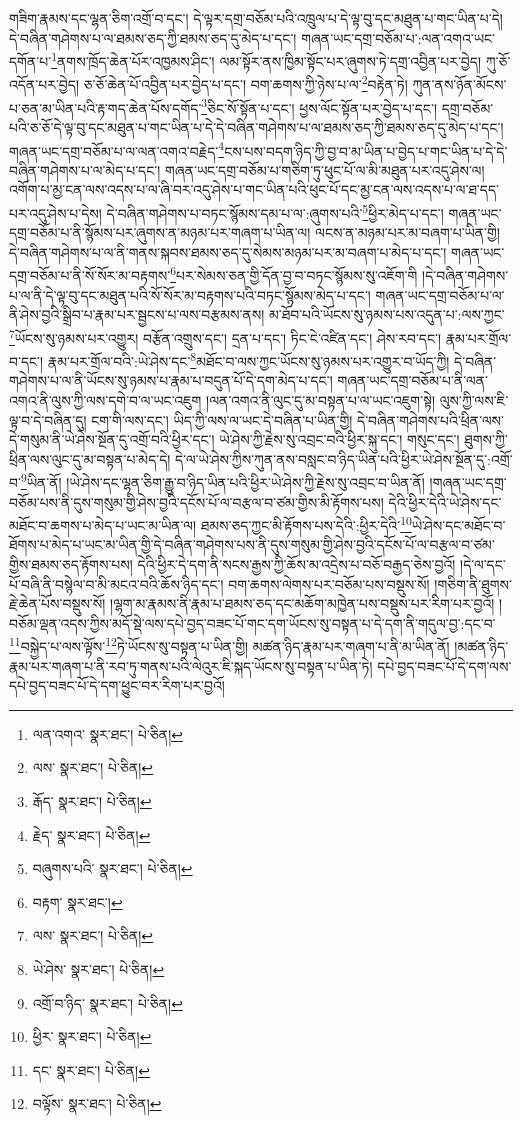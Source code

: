གཟིག་རྣམས་དང་ལྷན་ཅིག་འགྲོ་བ་དང་། དེ་ལྟར་དགྲ་བཅོམ་པའི་འཁྲུལ་པ་དེ་ལྟ་བུ་དང་མཐུན་པ་གང་ཡིན་པ་དེ། དེ་བཞིན་གཤེགས་པ་ལ་ཐམས་ཅད་ཀྱི་ཐམས་ཅད་དུ་མེད་པ་དང་། གཞན་ཡང་དགྲ་བཅོམ་པ་:ལན་འགའ་ཡང་དགོན་པ་\footnote{ལན་འགའ་  སྣར་ཐང་།  པེ་ཅིན། }ནགས་ཁྲོད་ཆེན་པོར་འཁྱམས་ཤིང་། ལམ་སྟོར་ནས་ཁྱིམ་སྟོང་པར་ཞུགས་ཏེ་དགྲ་འབྱིན་པར་བྱེད། ཀུ་ཅོ་འདོན་པར་བྱེད། ཅ་ཅོ་ཆེན་པོ་འབྱིན་པར་བྱེད་པ་དང་། བག་ཆགས་ཀྱི་ཉེས་པ་ལ་\footnote{ལས་  སྣར་ཐང་།  པེ་ཅིན། }བརྟེན་ཏེ། ཀུན་ནས་ཉོན་མོངས་པ་ཅན་མ་ཡིན་པའི་རྟ་གད་ཆེན་པོས་དགོད་\footnote{རྒོད་  སྣར་ཐང་།  པེ་ཅིན། }ཅིང་སོ་སྟོན་པ་དང་། ཕྱས་ལོང་སྟོན་པར་བྱེད་པ་དང་། དགྲ་བཅོམ་པའི་ཅ་ཅོ་དེ་ལྟ་བུ་དང་མཐུན་པ་གང་ཡིན་པ་དེ་དེ་བཞིན་གཤེགས་པ་ལ་ཐམས་ཅད་ཀྱི་ཐམས་ཅད་དུ་མེད་པ་དང་། གཞན་ཡང་དགྲ་བཅོམ་པ་ལ་ལན་འགའ་བརྗེད་\footnote{རྗེད་  སྣར་ཐང་།  པེ་ཅིན། }ངས་པས་བདག་ཉིད་ཀྱི་བྱ་བ་མ་ཡིན་པ་བྱེད་པ་གང་ཡིན་པ་དེ་དེ་བཞིན་གཤེགས་པ་ལ་མེད་པ་དང་། གཞན་ཡང་དགྲ་བཅོམ་པ་གཅིག་ཏུ་ཕུང་པོ་ལ་མི་མཐུན་པར་འདུ་ཤེས་ལ། འགོག་པ་མྱ་ངན་ལས་འདས་པ་ལ་ཞི་བར་འདུ་ཤེས་པ་གང་ཡིན་པའི་ཕུང་པོ་དང་མྱ་ངན་ལས་འདས་པ་ལ་ཐ་དད་པར་འདུ་ཤེས་པ་དེས། དེ་བཞིན་གཤེགས་པ་བཏང་སྙོམས་དམ་པ་ལ་:ཞུགས་པའི་\footnote{བཞུགས་པའི་  སྣར་ཐང་།  པེ་ཅིན། }ཕྱིར་མེད་པ་དང་། གཞན་ཡང་དགྲ་བཅོམ་པ་ནི་སྙོམས་པར་ཞུགས་ན་མཉམ་པར་གཞག་པ་ཡིན་ལ། ལངས་ན་མཉམ་པར་མ་བཞག་པ་ཡིན་གྱི། དེ་བཞིན་གཤེགས་པ་ལ་ནི་གནས་སྐབས་ཐམས་ཅད་དུ་སེམས་མཉམ་པར་མ་བཞག་པ་མེད་པ་དང་། གཞན་ཡང་དགྲ་བཅོམ་པ་ནི་སོ་སོར་མ་བརྟགས་\footnote{བརྟག་  སྣར་ཐང་། }པར་སེམས་ཅན་གྱི་དོན་བྱ་བ་བཏང་སྙོམས་སུ་འཇོག་གི །དེ་བཞིན་གཤེགས་པ་ལ་ནི་དེ་ལྟ་བུ་དང་མཐུན་པའི་སོ་སོར་མ་བརྟགས་པའི་བཏང་སྙོམས་མེད་པ་དང་། གཞན་ཡང་དགྲ་བཅོམ་པ་ལ་ནི་ཤེས་བྱའི་སྒྲིབ་པ་རྣམ་པར་སྦྱངས་པ་ལས་བརྩམས་ནས། མ་ཐོབ་པའི་ཡོངས་སུ་ཉམས་པས་འདུན་པ་:ལས་ཀྱང་\footnote{ལས་  སྣར་ཐང་།  པེ་ཅིན། }ཡོངས་སུ་ཉམས་པར་འགྱུར། བརྩོན་འགྲུས་དང་། དྲན་པ་དང་། ཏིང་ངེ་འཛིན་དང་། ཤེས་རབ་དང་། རྣམ་པར་གྲོལ་བ་དང་། རྣམ་པར་གྲོལ་བའི་:ཡེ་ཤེས་དང་\footnote{ཡེ་ཤེས་  སྣར་ཐང་།  པེ་ཅིན། }མཐོང་བ་ལས་ཀྱང་ཡོངས་སུ་ཉམས་པར་འགྱུར་བ་ཡོད་ཀྱི། དེ་བཞིན་གཤེགས་པ་ལ་ནི་ཡོངས་སུ་ཉམས་པ་རྣམ་པ་བདུན་པོ་དེ་དག་མེད་པ་དང་། གཞན་ཡང་དགྲ་བཅོམ་པ་ནི་ལན་འགའ་ནི་ལུས་ཀྱི་ལས་དགེ་བ་ལ་ཡང་འཇུག །ལན་འགའ་ནི་ལུང་དུ་མ་བསྟན་པ་ལ་ཡང་འཇུག་སྟེ། ལུས་ཀྱི་ལས་ཇི་ལྟ་བ་དེ་བཞིན་དུ། ངག་གི་ལས་དང་། ཡིད་ཀྱི་ལས་ལ་ཡང་དེ་བཞིན་པ་ཡིན་གྱི། དེ་བཞིན་གཤེགས་པའི་ཕྲིན་ལས་དེ་གསུམ་ནི་ཡེ་ཤེས་སྔོན་དུ་འགྲོ་བའི་ཕྱིར་དང་། ཡེ་ཤེས་ཀྱི་རྗེས་སུ་འབྲང་བའི་ཕྱིར་སྐུ་དང་། གསུང་དང་། ཐུགས་ཀྱི་ཕྲིན་ལས་ལུང་དུ་མ་བསྟན་པ་མེད་དེ། དེ་ལ་ཡེ་ཤེས་ཀྱིས་ཀུན་ནས་བསླང་བ་ཉིད་ཡིན་པའི་ཕྱིར་ཡེ་ཤེས་སྔོན་དུ་:འགྲོ་བ་\footnote{འགྲོ་བ་ཉིད་  སྣར་ཐང་།  པེ་ཅིན། }ཡིན་ནོ། །ཡེ་ཤེས་དང་ལྷན་ཅིག་རྒྱུ་བ་ཉིད་ཡིན་པའི་ཕྱིར་ཡེ་ཤེས་ཀྱི་རྗེས་སུ་འབྲང་བ་ཡིན་ནོ། །གཞན་ཡང་དགྲ་བཅོམ་པས་ནི་དུས་གསུམ་གྱི་ཤེས་བྱའི་དངོས་པོ་ལ་བརྩལ་བ་ཙམ་གྱིས་མི་རྟོགས་པས། དེའི་ཕྱིར་དེའི་ཡེ་ཤེས་དང་མཐོང་བ་ཆགས་པ་མེད་པ་ཡང་མ་ཡིན་ལ། ཐམས་ཅད་ཀྱང་མི་རྟོགས་པས་དེའི་:ཕྱིར་དེའི་\footnote{ཕྱིར་  སྣར་ཐང་།  པེ་ཅིན། }ཡེ་ཤེས་དང་མཐོང་བ་ཐོགས་པ་མེད་པ་ཡང་མ་ཡིན་གྱི་དེ་བཞིན་གཤེགས་པས་ནི་དུས་གསུམ་གྱི་ཤེས་བྱའི་དངོས་པོ་ལ་བརྩལ་བ་ཙམ་གྱིས་ཐམས་ཅད་རྟོགས་པས། དེའི་ཕྱིར་དེ་དག་ནི་སངས་རྒྱས་ཀྱི་ཆོས་མ་འདྲེས་པ་བཅོ་བརྒྱད་ཅེས་བྱའོ། །དེ་ལ་དང་པོ་བཞི་ནི་བསྙེལ་བ་མི་མངའ་བའི་ཆོས་ཉིད་དང་། བག་ཆགས་ལེགས་པར་བཅོམ་པས་བསྡུས་སོ། །གཅིག་ནི་ཐུགས་རྗེ་ཆེན་པོས་བསྡུས་སོ། །ལྷག་མ་རྣམས་ནི་རྣམ་པ་ཐམས་ཅད་དང་མཆོག་མཁྱེན་པས་བསྡུས་པར་རིག་པར་བྱའོ། །བཅོམ་ལྡན་འདས་ཀྱིས་མདོ་སྡེ་ལས་དཔེ་བྱད་བཟང་པོ་གང་དག་ཡོངས་སུ་བསྟན་པ་དེ་དག་ནི་གདུལ་བྱ་:དང་བ་\footnote{དང་  སྣར་ཐང་།  པེ་ཅིན། }བསྐྱེད་པ་ལས་ལྟོས་\footnote{བལྟོས་  སྣར་ཐང་།  པེ་ཅིན། }ཏེ་ཡོངས་སུ་བསྟན་པ་ཡིན་གྱི། མཚན་ཉིད་རྣམ་པར་གཞག་པ་ནི་མ་ཡིན་ནོ། །མཚན་ཉིད་རྣམ་པར་གཞག་པ་ནི་རབ་ཏུ་གནས་པའི་ལེའུར་ཇི་སྐད་ཡོངས་སུ་བསྟན་པ་ཡིན་ཏེ། དཔེ་བྱད་བཟང་པོ་དེ་དག་ལས་དཔེ་བྱད་བཟང་པོ་དེ་དག་ཕྱུང་བར་རིག་པར་བྱའོ། 